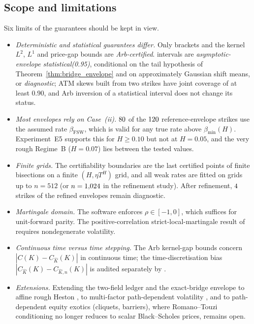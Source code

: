 \subsection{Scope and limitations}

Six limits of the guarantees should be kept in view.
\begin{itemize}
  \item \emph{Deterministic and statistical guarantees differ.} Only \RCDet{} brackets and the kernel $L^2$, $L^1$ and price-gap bounds are \emph{Arb-certified}. \RCBridge{} intervals are \emph{asymptotic-envelope statistical(0.95)}, conditional on the tail hypothesis of Theorem~\ref{thm:bridge_envelope} and on approximately Gaussian shift means, or \emph{diagnostic}; ATM skews built from two strikes have joint coverage of at least $0.90$, and Arb inversion of a statistical interval does not change its status.
  \item \emph{Most envelopes rely on Case~(ii).} $80$ of the $120$ reference-envelope strikes use the assumed rate $\beta_{\mathrm{FSW}}$, which is valid for any true rate above $\beta_{\min}(H)$. Experiment~E5 supports this for $H\ge 0.10$ but not at $H=0.05$, and the very rough Regime~B ($H=0.07$) lies between the tested values.
  \item \emph{Finite grids.} The certifiability boundaries are the last certified points of finite bisections on a finite $(H,\eta T^H)$ grid, and all weak rates are fitted on grids up to $n=512$ (or $n=1{,}024$ in the refinement study). After refinement, $4$ strikes of the refined envelopes remain diagnostic.
  \item \emph{Martingale domain.} The software enforces $\rho\in[-1,0]$, which suffices for unit-forward parity. The positive-correlation strict-local-martingale result of \citet{Gassiat2019} requires nondegenerate volatility.
  \item \emph{Continuous time versus time stepping.} The Arb kernel-gap bounds concern $|C(K)-C_{\hat{K}}(K)|$ in continuous time; the time-discretisation bias $|C_{\hat{K}}(K)-C_{\hat{K},n}(K)|$ is audited separately by \RCBridge{}.
  \item \emph{Extensions.} Extending the two-field ledger and the exact-bridge envelope to affine rough Heston \citep{ElEuchRosenbaum2019,BayerBreneis2024}, to multi-factor path-dependent volatility \citep{AbiJaberIllandLi2025}, and to path-dependent equity exotics (cliquets, barriers), where Romano--Touzi conditioning no longer reduces to scalar Black--Scholes prices, remains open.
\end{itemize}

\FloatBarrier
